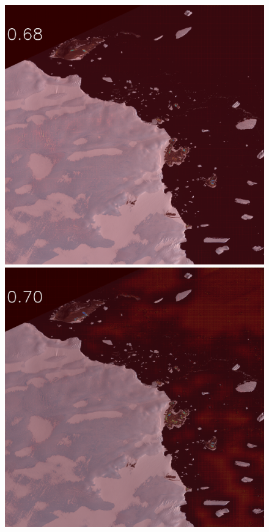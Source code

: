 \begin{figure}[h]
\includegraphics[width=\subFigx]{./fig/datagrow/MSE_single_unet_train_1_1.txt_bias-1_bs128_do0.1e25/3.png}
\includegraphics[width=\subFigx]{./fig/datagrow/MSE_single_unet_train_1_2.txt_bias-1_bs128_do0.1e25/3.png}

\end{figure}
